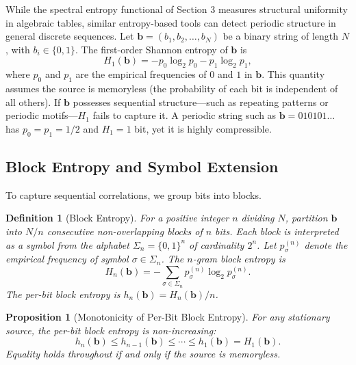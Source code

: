 \documentclass[11pt,twoside]{article}
\newtheorem{definition}{Definition}
\newtheorem{proposition}{Proposition}
\begin{document}
While the spectral entropy functional of Section 3 measures structural uniformity in algebraic tables, similar entropy-based tools can detect periodic structure in general discrete sequences. Let $\mathbf{b} = (b_1, b_2, \dots, b_N)$ be a binary string of length $N$, with $b_i \in \{0, 1\}$. The first-order Shannon entropy of $\mathbf{b}$ is
\begin{equation}
	H_1(\mathbf{b}) = -p_0 \log_2 p_0 - p_1 \log_2 p_1,
\end{equation}
where $p_0$ and $p_1$ are the empirical frequencies of $0$ and $1$ in $\mathbf{b}$. This quantity assumes the source is memoryless (the probability of each bit is independent of all others). If $\mathbf{b}$ possesses sequential structure---such as repeating patterns or periodic motifs---$H_1$ fails to capture it. A periodic string such as $\mathbf{b} = 010101\dots$ has $p_0 = p_1 = 1/2$ and $H_1 = 1$ bit, yet it is highly compressible.

\subsection{Block Entropy and Symbol Extension}

To capture sequential correlations, we group bits into blocks.
\begin{definition}[Block Entropy]
	For a positive integer $n$ dividing $N$, partition $\mathbf{b}$ into $N/n$ consecutive non-overlapping blocks of $n$ bits. Each block is interpreted as a symbol from the alphabet $\Sigma_n = \{0, 1\}^n$ of cardinality $2^n$. Let $p_\sigma^{(n)}$ denote the empirical frequency of symbol $\sigma \in \Sigma_n$. The \emph{$n$-gram block entropy} is
	\begin{equation}
		H_n(\mathbf{b}) = -\sum_{\sigma \in \Sigma_n} p_\sigma^{(n)} \log_2 p_\sigma^{(n)}.
	\end{equation}
	The \emph{per-bit block entropy} is $h_n(\mathbf{b}) = H_n(\mathbf{b}) / n$.
\end{definition}

\begin{proposition}[Monotonicity of Per-Bit Block Entropy]
	For any stationary source, the per-bit block entropy is non-increasing:
	\begin{equation}
		h_n(\mathbf{b}) \leq h_{n-1}(\mathbf{b}) \leq \cdots \leq h_1(\mathbf{b}) = H_1(\mathbf{b}).
	\end{equation}
	Equality holds throughout if and only if the source is memoryless.
\end{proposition}
\end{document}
